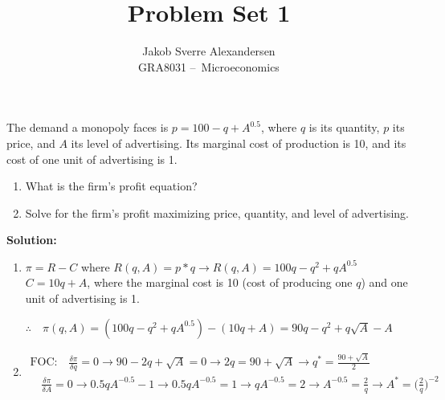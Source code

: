 \documentclass[10pt]{article}
\newenvironment{problem}[2][Problem]{\begin{trivlist}
\item[\hskip \labelsep {\bfseries #1}\hskip \labelsep {\bfseries #2.}]}{\end{trivlist}}
\begin{document}
 
\title{Problem Set 1}
\author{Jakob Sverre Alexandersen\\
GRA8031 – Microeconomics}
\maketitle
 
\begin{problem}{1}
The demand a monopoly faces is $p = 100 - q + A^{0.5}$, where $q$ is its quantity, $p$ its price, and $A$ its level of advertising.
Its marginal cost of production is 10, and its cost of one unit of advertising is 1. 

\begin{enumerate}[label=\alph*)]
    \item What is the firm's profit equation?
    \item Solve for the firm's profit maximizing price, quantity, and level of advertising.
\end{enumerate}

\end{problem}

\textbf{Solution:}
    
\begin{enumerate}[label=\alph*)]
    \item $\pi = R - C$ where $R(q, A) = p * q \to R(q, A) = 100q - q^2 + qA^{0.5}$ \\
    $C = 10q + A$, where the marginal cost is 10 (cost of producing one $q$) and one unit of advertising is 1.

    $\therefore\quad \pi(q, A) = (100q - q^2 + qA^{0.5}) - (10q + A) = 90q - q^2 + q\sqrt{A} - A$ 
    \item \begin{align}
        \text{FOC:} \quad\frac{\delta\pi}{\delta q} = 0 \to 90 - 2q + \sqrt{A} = 0 \to 2q = 90 + \sqrt{A} \to q^* = \frac{90 + \sqrt{A}}{2}\\
        \quad\frac{\delta\pi}{\delta A} = 0 \to 0.5qA^{-0.5} - 1 \to 0.5qA^{-0.5} = 1 \to qA^{-0.5} = 2 \to A^{-0.5} = \frac{2}{q} \to A^* = \bigg(\frac{2}{q}\bigg)^{-2}
    \end{align}
\end{enumerate}

\end{document}
